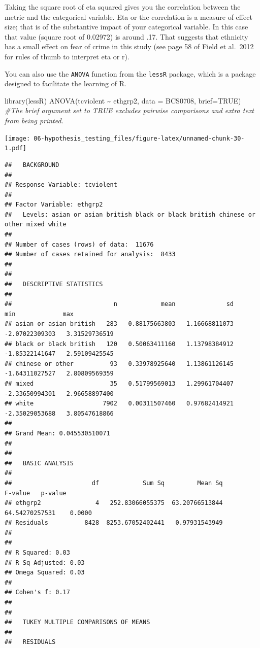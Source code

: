 \documentclass[
]{book}
\newenvironment{Shaded}{\begin{snugshade}}{\end{snugshade}}
\newcommand{\AttributeTok}[1]{\textcolor[rgb]{0.77,0.63,0.00}{#1}}
\newcommand{\CommentTok}[1]{\textcolor[rgb]{0.56,0.35,0.01}{\textit{#1}}}
\newcommand{\ConstantTok}[1]{\textcolor[rgb]{0.00,0.00,0.00}{#1}}
\newcommand{\FunctionTok}[1]{\textcolor[rgb]{0.00,0.00,0.00}{#1}}
\newcommand{\NormalTok}[1]{#1}
\newcommand{\SpecialCharTok}[1]{\textcolor[rgb]{0.00,0.00,0.00}{#1}}
\begin{document}
Taking the square root of eta squared gives you the correlation between the metric and the categorical variable. Eta or the correlation is a measure of effect size; that is of the substantive impact of your categorical variable. In this case that value (square root of 0.02972) is around .17. That suggests that ethnicity has a small effect on fear of crime in this study (see page 58 of Field et al.~2012 for rules of thumb to interpret eta or r).

You can also use the \texttt{ANOVA} function from the \texttt{lessR} package, which is a package designed to facilitate the learning of R.

\begin{Shaded}
\begin{Highlighting}[]
\FunctionTok{library}\NormalTok{(lessR)}
\FunctionTok{ANOVA}\NormalTok{(tcviolent }\SpecialCharTok{\textasciitilde{}}\NormalTok{ ethgrp2, }\AttributeTok{data =}\NormalTok{ BCS0708, }\AttributeTok{brief=}\ConstantTok{TRUE}\NormalTok{) }\CommentTok{\#The brief argument set to TRUE excludes pairwise comparisons and extra text from being printed.}
\end{Highlighting}
\end{Shaded}

\texttt{[image: 06-hypothesis\_testing\_files/figure-latex/unnamed-chunk-30-1.pdf]}

\begin{verbatim}
##   BACKGROUND
## 
## Response Variable: tcviolent 
##  
## Factor Variable: ethgrp2 
##   Levels: asian or asian british black or black british chinese or other mixed white 
##  
## Number of cases (rows) of data:  11676 
## Number of cases retained for analysis:  8433 
## 
## 
##   DESCRIPTIVE STATISTICS 
## 
##                            n            mean              sd              min             max 
## asian or asian british   283   0.88175663803   1.16668811073   -2.07022309303   3.31529736519 
## black or black british   120   0.50063411160   1.13798384912   -1.85322141647   2.59109425545 
## chinese or other          93   0.33978925640   1.13861126145   -1.64311027527   2.80809569359 
## mixed                     35   0.51799569013   1.29961704407   -2.33650994301   2.96658897400 
## white                   7902   0.00311507460   0.97682414921   -2.35029053688   3.80547618866 
##  
## Grand Mean: 0.045530510071 
## 
## 
##   BASIC ANALYSIS
## 
##                      df            Sum Sq         Mean Sq         F-value   p-value 
## ethgrp2               4   252.83066055375  63.20766513844 64.54270257531    0.0000 
## Residuals          8428  8253.67052402441   0.97931543949 
## 
## 
## R Squared: 0.03 
## R Sq Adjusted: 0.03 
## Omega Squared: 0.03 
##  
## Cohen's f: 0.17 
## 
## 
##   TUKEY MULTIPLE COMPARISONS OF MEANS
## 
##   RESIDUALS
\end{verbatim}
\end{document}
